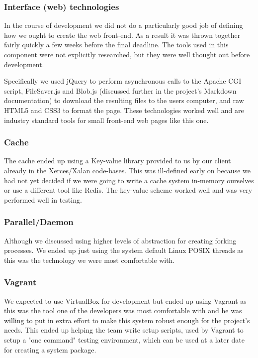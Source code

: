 \subsubsection{Interface (web) technologies}

In the course of development we did not do a particularly good job of defining how we ought to create the web front-end.
As a result it was thrown together fairly quickly a few weeks before the final deadline.
The tools used in this component were not explicitly researched, but they were well thought out before development.

Specifically we used jQuery to perform asynchronous calls to the Apache CGI script, FileSaver.js and Blob.js (discussed further in the project's Markdown documentation) to download the resulting files to the users computer, and raw HTML5 and CSS3 to format the page.
These technologies worked well and are industry standard tools for small front-end web pages like this one.

\subsubsection{Cache}

The cache ended up using a Key-value library provided to us by our client already in the Xerces/Xalan code-bases.
This was ill-defined early on because we had not yet decided if we were going to write a cache system in-memory ourselves or use a different tool like Redis.
The key-value scheme worked well and was very performed well in testing.

\subsubsection{Parallel/Daemon}

Although we discussed using higher levels of abstraction for creating forking processes.
We ended up just using the system default Linux POSIX threads as this was the technology we were most comfortable with.

\subsubsection{Vagrant}

We expected to use VirtualBox for development but ended up using Vagrant as this was the tool one of the developers was most comfortable with and he was willing to put in extra effort to make this system robust enough for the project's needs.
This ended up helping the team write setup scripts, used by Vagrant to setup a "one command" testing environment, which can be used at a later date for creating a system package.

